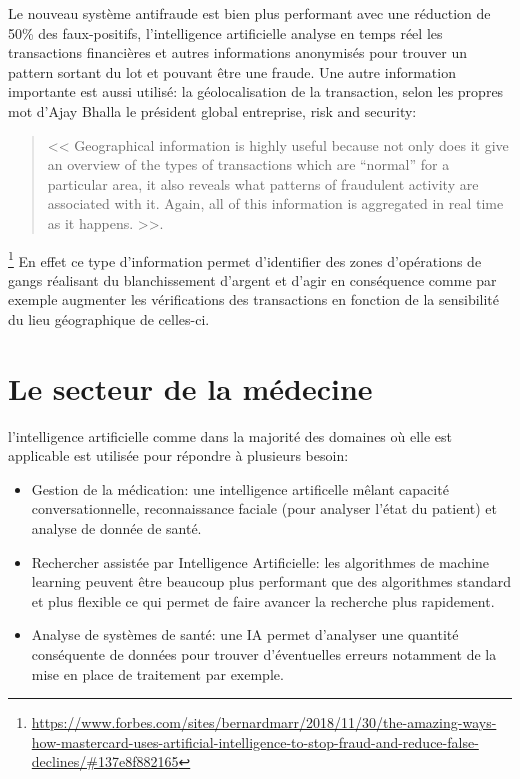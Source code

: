             Le nouveau système antifraude est bien plus performant avec une réduction 
            de 50\% des faux-positifs, l'intelligence artificielle analyse en temps réel 
            les transactions financières et autres informations anonymisés
            pour trouver un pattern sortant du lot et pouvant être une fraude. 
            Une autre information importante est aussi utilisé: la géolocalisation 
            de la transaction, selon les propres mot d'Ajay Bhalla le président 
            global entreprise, risk and security: 
            \begin{quote}
                << Geographical information is highly useful because 
                not only does it give an overview of the types of transactions which are “normal” 
                for a particular area, it also reveals what patterns of fraudulent activity 
                are associated with it. Again, all of this information is aggregated in real time 
                as it happens. >>.
            \end{quote}
            \footnote{\url{https://www.forbes.com/sites/bernardmarr/2018/11/30/the-amazing-ways-how-mastercard-uses-artificial-intelligence-to-stop-fraud-and-reduce-false-declines/\#137e8f882165}}
            En effet ce type d'information permet d'identifier des zones d'opérations de gangs réalisant du blanchissement 
            d'argent et d'agir en conséquence comme par exemple augmenter les vérifications des transactions en fonction
            de la sensibilité du lieu géographique de celles-ci. \newline


    \section{Le secteur de la médecine}
        l'intelligence artificielle comme dans la majorité des domaines où elle est applicable est utilisée
        pour répondre à plusieurs besoin:
        \begin{itemize}
            \item Gestion de la médication: une intelligence artificelle mêlant capacité conversationnelle,
            reconnaissance faciale (pour analyser l'état du patient) et analyse de donnée de santé. \newline
            \item Rechercher assistée par Intelligence Artificielle: les algorithmes de machine learning peuvent
            être beaucoup plus performant que des algorithmes standard et plus flexible ce qui permet 
            de faire avancer la recherche plus rapidement. \newline 
            \item Analyse de systèmes de santé: une IA permet d'analyser une quantité conséquente de données 
            pour trouver d'éventuelles erreurs notamment de la mise en place de traitement par exemple.
        \end{itemize}

